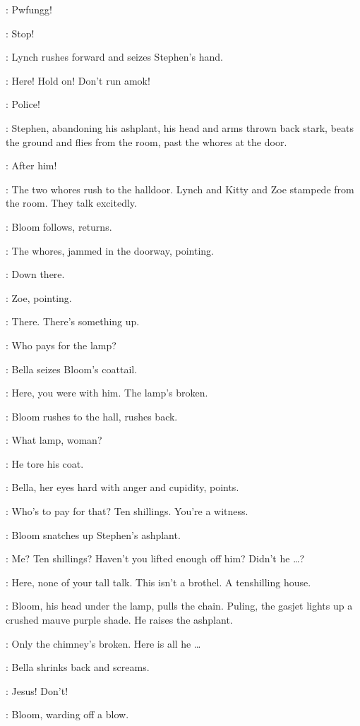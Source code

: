\Gasjet[2]:
Pwfungg!

\Bloom:
Stop!

:
Lynch rushes forward and seizes Stephen's hand.

\Lynch:
Here!
Hold on!
Don't run amok!

\Bella:
Police!

:
Stephen, abandoning his ashplant, his head and arms thrown back stark,
beats the ground and flies from the room, past the whores at the door.

\Bella:
After him!

:
The two whores rush to the halldoor.
Lynch and Kitty and Zoe stampede from the room.
They talk excitedly.

:
Bloom follows, returns.

:
The whores, jammed in the doorway, pointing.

\Whores:
Down there.

:
Zoe, pointing.

\Zoe:
There.
There's something up.

\Bella:
Who pays for the lamp?

:
Bella seizes Bloom's coattail.

\Bella:
Here, you were with him.
The lamp's broken.

:
Bloom rushes to the hall, rushes back.

\Bloom:
What lamp, woman?

\AWhore:
He tore his coat.

:
Bella, her eyes hard with anger and cupidity, points.

\Bella:
Who's to pay for that?
Ten shillings.
You're a witness.

:
Bloom snatches up Stephen's ashplant.

\Bloom:
Me? Ten shillings?
Haven't you lifted enough off him?
Didn't he \ldots?

\Bella:
Here, none of your tall talk.
This isn't a brothel.
A tenshilling house.

:
Bloom, his head under the lamp, pulls the chain.
Puling, the gasjet lights up a crushed mauve purple shade.
He raises the ashplant.

\Bloom:
Only the chimney's broken.
Here is all he \ldots

:
Bella shrinks back and screams.

\Bella:
Jesus!
Don't!

:
Bloom, warding off a blow.

